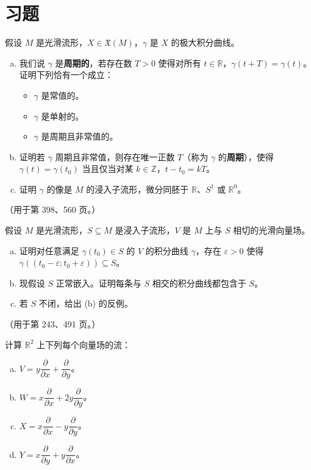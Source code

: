 \documentclass[../../main.tex]{subfiles}
\begin{document}
\section{习题}\label{section:ch09-习题}

\begin{exercise}\label{exercise:ch09-01}
假设 $M$ 是光滑流形，$X\in\mathfrak{X}(M)$，$\gamma$ 是 $X$ 的极大积分曲线。
\begin{enumerate}[(a)]
\item 我们说 $\gamma$ 是\textbf{周期的}，若存在数 $T>0$ 使得对所有 $t\in\mathbb{R}$，$\gamma(t+T)=\gamma(t)$。证明下列恰有一个成立：
\begin{itemize}
\item $\gamma$ 是常值的。
\item $\gamma$ 是单射的。
\item $\gamma$ 是周期且非常值的。
\end{itemize}
\item 证明若 $\gamma$ 周期且非常值，则存在唯一正数 $T$（称为 $\gamma$ 的\textbf{周期}），使得 $\gamma(t)=\gamma(t_0)$ 当且仅当对某 $k\in\mathbb{Z}$，$t-t_0=kT$。
\item 证明 $\gamma$ 的像是 $M$ 的浸入子流形，微分同胚于 $\mathbb{R}$、$S^1$ 或 $\mathbb{R}^0$。
\end{enumerate}
（用于第 398、560 页。）
\end{exercise}

\begin{exercise}\label{exercise:ch09-02}
假设 $M$ 是光滑流形，$S\subseteq M$ 是浸入子流形，$V$ 是 $M$ 上与 $S$ 相切的光滑向量场。
\begin{enumerate}[(a)]
\item 证明对任意满足 $\gamma(t_0)\in S$ 的 $V$ 的积分曲线 $\gamma$，存在 $\varepsilon>0$ 使得 $\gamma((t_0-\varepsilon;t_0+\varepsilon))\subseteq S$。
\item 现假设 $S$ 正常嵌入。证明每条与 $S$ 相交的积分曲线都包含于 $S$。
\item 若 $S$ 不闭，给出 (b) 的反例。
\end{enumerate}
（用于第 243、491 页。）
\end{exercise}

\begin{exercise}\label{exercise:ch09-03}
计算 $\mathbb{R}^2$ 上下列每个向量场的流：
\begin{enumerate}[(a)]
\item $V=y\dfrac{\partial}{\partial x}+\dfrac{\partial}{\partial y}$。
\item $W=x\dfrac{\partial}{\partial x}+2y\dfrac{\partial}{\partial y}$。
\item $X=x\dfrac{\partial}{\partial x}-y\dfrac{\partial}{\partial y}$。
\item $Y=x\dfrac{\partial}{\partial y}+y\dfrac{\partial}{\partial x}$。
\end{enumerate}
\end{exercise}
\end{document}
